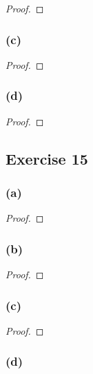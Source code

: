 \documentclass[14pt]{extarticle}
\begin{document}
\begin{proof}

\end{proof}

\subsubsection{(c)}

\begin{proof}

\end{proof}

\subsubsection{(d)}

\begin{proof}

\end{proof}

\subsection{Exercise 15}

\subsubsection{(a)}

\begin{proof}

\end{proof}

\subsubsection{(b)}

\begin{proof}

\end{proof}

\subsubsection{(c)}

\begin{proof}

\end{proof}

\subsubsection{(d)}
\end{document}
